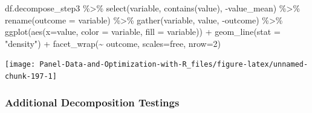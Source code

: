 \documentclass[
]{book}
\newenvironment{Shaded}{\begin{snugshade}}{\end{snugshade}}
\newcommand{\AttributeTok}[1]{\textcolor[rgb]{0.77,0.63,0.00}{#1}}
\newcommand{\DecValTok}[1]{\textcolor[rgb]{0.00,0.00,0.81}{#1}}
\newcommand{\FunctionTok}[1]{\textcolor[rgb]{0.00,0.00,0.00}{#1}}
\newcommand{\NormalTok}[1]{#1}
\newcommand{\SpecialCharTok}[1]{\textcolor[rgb]{0.00,0.00,0.00}{#1}}
\newcommand{\StringTok}[1]{\textcolor[rgb]{0.31,0.60,0.02}{#1}}
\begin{document}
\begin{Shaded}
\begin{Highlighting}[]
\NormalTok{df.decompose\_step3 }\SpecialCharTok{\%\textgreater{}\%}
    \FunctionTok{select}\NormalTok{(variable, }\FunctionTok{contains}\NormalTok{(}\StringTok{\textquotesingle{}value\textquotesingle{}}\NormalTok{), }\SpecialCharTok{{-}}\NormalTok{value\_mean) }\SpecialCharTok{\%\textgreater{}\%}
    \FunctionTok{rename}\NormalTok{(}\AttributeTok{outcome =}\NormalTok{ variable) }\SpecialCharTok{\%\textgreater{}\%}
    \FunctionTok{gather}\NormalTok{(variable, value, }\SpecialCharTok{{-}}\NormalTok{outcome) }\SpecialCharTok{\%\textgreater{}\%}
    \FunctionTok{ggplot}\NormalTok{(}\FunctionTok{aes}\NormalTok{(}\AttributeTok{x=}\NormalTok{value, }\AttributeTok{color =}\NormalTok{ variable, }\AttributeTok{fill =}\NormalTok{ variable)) }\SpecialCharTok{+}
        \FunctionTok{geom\_line}\NormalTok{(}\AttributeTok{stat =} \StringTok{"density"}\NormalTok{) }\SpecialCharTok{+}
        \FunctionTok{facet\_wrap}\NormalTok{(}\SpecialCharTok{\textasciitilde{}}\NormalTok{ outcome, }\AttributeTok{scales=}\StringTok{\textquotesingle{}free\textquotesingle{}}\NormalTok{, }\AttributeTok{nrow=}\DecValTok{2}\NormalTok{)}
\end{Highlighting}
\end{Shaded}

\begin{center}\texttt{[image: Panel-Data-and-Optimization-with-R\_files/figure-latex/unnamed-chunk-197-1]} \end{center}

\hypertarget{additional-decomposition-testings}{%
\subsubsection{Additional Decomposition Testings}\label{additional-decomposition-testings}}
\end{document}
